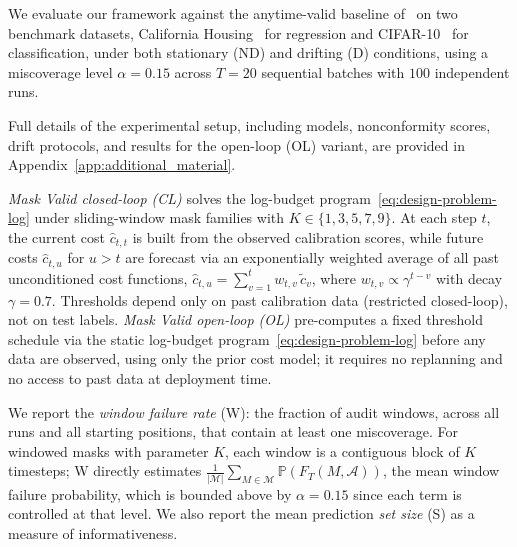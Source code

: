 \documentclass{uai2026} %
\newcommand{\1}{\mathbf{1}}
\newcommand{\prob}{\mathbb{P}}
\newcommand{\mcal}{\mathcal{M}}
\newcommand{\acal}{\mathcal{A}}
\begin{document}
We evaluate our framework against the anytime-valid baseline of~\citet{gauthier2025values} on two benchmark datasets, California Housing~\citep{california_housing} for regression and CIFAR-10~\citep{cifar10} for classification, under both stationary (ND) and drifting  (D) conditions, using a miscoverage level $\alpha = 0.15$ across $T = 20$ sequential batches with $100$ independent runs.

Full details of the experimental setup, including models, nonconformity scores, drift protocols, and results for the open-loop (OL) variant, are provided in Appendix~\ref{app:additional_material}.
\label{sec:exp-setup}

\emph{Mask Valid closed-loop (CL)} solves the log-budget program~\eqref{eq:design-problem-log} under sliding-window mask families with $K \in \{1, 3, 5, 7, 9\}$.
At each step $t$, the current cost $\hat{c}_{t,t}$ is built from the observed calibration scores, while future costs $\hat{c}_{t,u}$ for $u > t$ are forecast via an exponentially weighted average of all past unconditioned cost functions, $\hat{c}_{t,u} = \sum_{v=1}^{t} w_{t,v}\, \tilde{c}_v$, where $w_{t,v} \propto \gamma^{t-v}$ with decay $\gamma = 0.7$.
Thresholds depend only on past calibration data (restricted closed-loop), not on test labels.
\emph{Mask Valid open-loop (OL)} pre-computes a fixed threshold schedule via the static log-budget program~\eqref{eq:design-problem-log} before any data are observed, using only the prior cost model; it requires no replanning and no access to past data at deployment time.

We report the \emph{window failure rate} (W): the fraction of audit windows, across all runs and all starting positions, that contain at least one miscoverage.
For windowed masks with parameter $K$, each window is a contiguous block of $K$ timesteps; W directly estimates $\frac{1}{|\mcal|}\sum_{M \in \mcal}
\prob(F_T(M, \acal))$, the mean window failure probability, which is bounded
above by $\alpha = 0.15$ since each term is controlled at that level.
We also report the mean prediction \emph{set size} (S) as a measure of informativeness.

\end{document}
